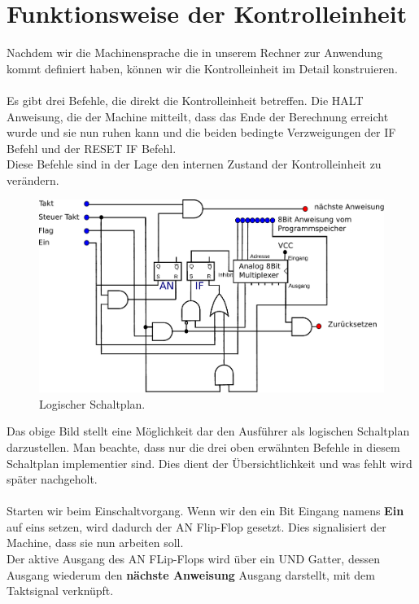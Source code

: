 \documentclass[11pt,a4paper,leqno]{report}
\numberwithin{equation}{chapter}
\begin{document}
\section{Funktionsweise der Kontrolleinheit}
Nachdem wir die Machinensprache die in unserem Rechner zur Anwendung kommt definiert haben, k\"onnen wir die Kontrolleinheit im Detail konstruieren.\\
\\
Es gibt drei Befehle, die direkt die Kontrolleinheit betreffen. Die HALT Anweisung, die der Machine mitteilt, dass das Ende der Berechnung erreicht wurde und sie nun ruhen kann und die beiden bedingte Verzweigungen der IF Befehl und der RESET IF Befehl.\\
Diese Befehle sind in der Lage den internen Zustand der Kontrolleinheit zu ver\"andern.
\begin{figure}[H]
	\begin{center}
		\includegraphics[scale=0.6]{ausfuhrer.pdf}
		\caption{Logischer Schaltplan.}
	\end{center}
\end{figure}
\noindent
Das obige Bild stellt eine M\"oglichkeit dar den Ausf\"uhrer als logischen Schaltplan darzustellen. Man beachte, dass nur die drei oben erw\"ahnten Befehle in diesem Schaltplan implementier sind. Dies dient der \"Ubersichtlichkeit und was fehlt wird sp\"ater nachgeholt.\\
\\
Starten wir beim Einschaltvorgang. Wenn wir den ein Bit Eingang namens \textbf{Ein} auf eins setzen, wird dadurch der AN Flip-Flop gesetzt. Dies signalisiert der Machine, dass sie nun arbeiten soll.\\
Der aktive Ausgang des AN FLip-Flops wird \"uber ein UND Gatter, dessen Ausgang wiederum den \textbf{n\"achste Anweisung} Ausgang darstellt, mit dem Taktsignal verkn\"upft.
\end{document}
